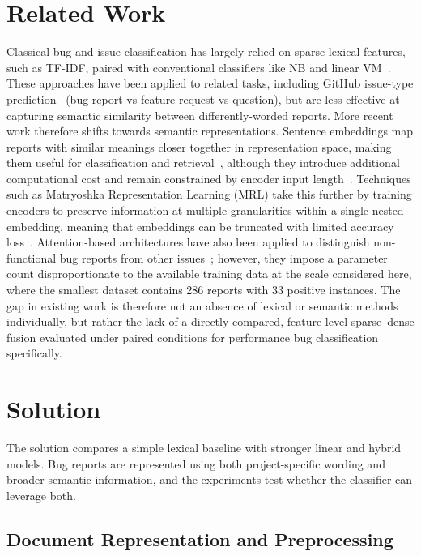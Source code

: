 \documentclass[10pt,a4paper]{article}
\begin{document}
\section{Related Work}
Classical bug and issue classification has largely relied on sparse lexical features, such as TF-IDF, paired with conventional classifiers like NB and linear VM~\cite{McCallum1998ACO,fan2008liblinear}. These approaches have been applied to related tasks, including GitHub issue-type prediction~\cite{kallis_predicting_2021} (bug report vs feature request vs question), but are less effective at capturing semantic similarity between differently-worded reports.
More recent work therefore shifts towards semantic representations. Sentence embeddings map reports with similar meanings closer together in representation space, making them useful for classification and retrieval~\cite{reimers_sentence-bert_2019}, although they introduce additional computational cost and remain constrained by encoder input length~\cite{reimers_sentence-bert_2019,nussbaum_nomic_2025}.
Techniques such as Matryoshka Representation Learning (MRL) take this further by training encoders to preserve information at multiple granularities within a single nested embedding, meaning that embeddings can be truncated with limited accuracy loss~\cite{kusupati2022matryoshka}. Attention-based architectures have also been applied to distinguish non-functional bug reports from other issues~\cite{long2022multifacetedhierarchicalreportidentification}; however, they impose a parameter count disproportionate to the available training data at the scale considered here, where the smallest dataset contains 286 reports with 33 positive instances. 
The gap in existing work is therefore not an absence of lexical or semantic methods individually, but rather the lack of a directly compared, feature-level sparse--dense fusion evaluated under paired conditions for performance bug classification specifically.


\section{Solution}

The solution compares a simple lexical baseline with stronger linear and hybrid models. Bug reports are represented using both project-specific wording and broader semantic information, and the experiments test whether  the classifier can leverage both.


\subsection{Document Representation and Preprocessing}\label{doc-representation-preprocessing}
\end{document}
